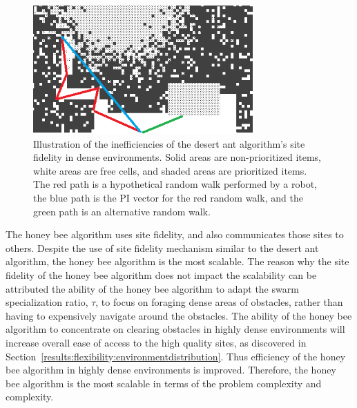 \begin{figure}[!htb]
\centering
\includegraphics[width=0.75\textwidth]{chapters/chapter6/figures/problem-scalability-desertant.png}
\caption{Illustration of the inefficiencies of the desert ant algorithm's site fidelity in dense environments. Solid areas are non-prioritized items, white areas are free cells, and shaded areas are prioritized items. The red path is a hypothetical random walk performed by a robot, the blue path is the PI vector for the red random walk, and the green path is an alternative random walk.}
\label{fig:desertantsitefidelity}
\end{figure}

The honey bee algorithm uses site fidelity, and also communicates those sites to others. Despite the use of site fidelity mechanism similar to the desert ant algorithm, the honey bee algorithm is the most scalable. The reason why the site fidelity of the honey bee algorithm does not impact the scalability can be attributed the ability of the honey bee algorithm to adapt the swarm specialization ratio, $\tau$, to focus on foraging dense areas of obstacles, rather than having to expensively navigate around the obstacles. The ability of the honey bee algorithm to concentrate on clearing obstacles in highly dense environments will increase overall ease of access to the high quality sites, as discovered in Section~\ref{results:flexibility:environmentdistribution}. Thus efficiency of the honey bee algorithm in highly dense environments is improved. Therefore, the honey bee algorithm is the most scalable in terms of the problem complexity and complexity.

